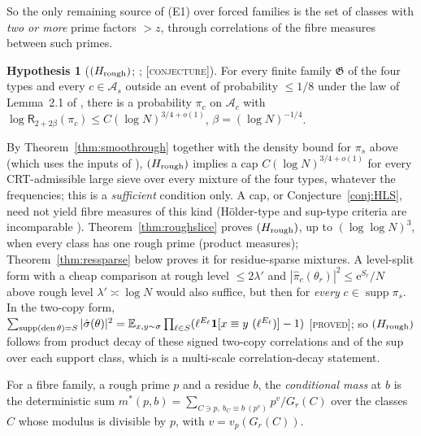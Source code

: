 \documentclass[10pt,reqno]{amsart}
\theoremstyle{definition}
\newtheorem{hypothesis}[theorem]{Hypothesis}
\theoremstyle{remark}
\newcommand{\A}{\mathcal A}
\newcommand{\cG}{\mathfrak G}
\newcommand{\E}{\mathbb E}
\newcommand{\ind}{\mathbf 1}
\newcommand{\e}{\mathrm e}
\newcommand{\lab}[1]{\textup{[\textsc{#1}]}}
\begin{document}
So the only remaining source of (E1) over forced families is the set of
classes with \emph{two or more} prime factors $>z$, through correlations of
the fibre measures between such primes.

\begin{hypothesis}[$(H_{\rm rough})$; {\cite[\S4]{LS3}}; \lab{conjecture}]\label{hyp:Hrough}
For every finite family $\cG$ of the four types and every
$c\in\A_s$ outside an event of probability $\leq1/8$ under the law of
Lemma~2.1 of \cite{LS3}, there is a probability $\pi_c$ on $\A_c$ with
$\log\mathsf R_{2+2\beta}(\pi_c)\leq C(\log N)^{3/4+o(1)}$, $\beta=(\log N)^{-1/4}$.
\end{hypothesis}
By Theorem~\ref{thm:smoothrough} together with the density bound for $\pi_s$ above
(which uses the inputs of \cite{KA2}), $(H_{\rm rough})$ implies a cap
$C(\log N)^{3/4+o(1)}$ for every CRT-admissible large sieve over every
mixture of the four types, whatever the frequencies; this is a \emph{sufficient} condition
only.  A cap, or Conjecture~\ref{conj:HLS}, need not yield fibre measures of
this kind (H\"older-type and sup-type criteria are incomparable
\cite[\S5]{LS2}).  Theorem~\ref{thm:roughslice} proves $(H_{\rm rough})$, up to
$(\log\log N)^3$, when every class has one rough prime (product measures);
Theorem~\ref{thm:ressparse} below proves it for residue-sparse mixtures.  A
level-split form with a cheap comparison at rough level $\leq2\lambda'$ and
$|\hat\pi_c(\theta_r)|^2\leq\e^{S_r}/N$ above rough level $\lambda'\asymp\log N$ would also
suffice, but then for \emph{every} $c\in\operatorname{supp}\pi_s$.  In the two-copy form,
$\sum_{\operatorname{supp}({\rm den}\,\theta)=S}|\hat\sigma(\theta)|^2=\E_{x,y\sim\sigma}\prod_{\ell\in S}(\ell^{E_\ell}\ind[x\equiv y\ (\ell^{E_\ell})]-1)$
\cite[Lemma~4.1]{LS3} \lab{proved}; so $(H_{\rm rough})$ follows from product
decay of these signed two-copy correlations and of the sup over each
support class, which is a multi-scale correlation-decay statement.

For a fibre family, a rough prime $p$ and a residue $b$, the \emph{conditional
mass} at $b$ is the deterministic sum
$m^*(p,b)=\sum_{C\ni p,\ b_C\equiv b\ (p^{v})}p^{v}/G_r(C)$ over the classes $C$ whose modulus is
divisible by $p$, with $v=v_p(G_r(C))$.
\end{document}
